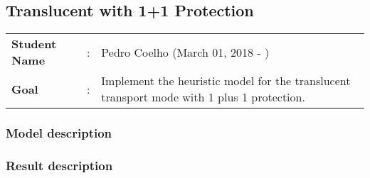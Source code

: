 \clearpage

\subsection{Translucent with 1+1 Protection}\label{heuristic_Transluc_Protection}
\begin{tcolorbox}	
\begin{tabular}{p{2.75cm} p{0.2cm} p{10.5cm}} 	
\textbf{Student Name}  &:& Pedro Coelho    (March 01, 2018 - )\\
\textbf{Goal}          &:& Implement the heuristic model for the translucent transport mode with 1 plus 1 protection.
\end{tabular}
\end{tcolorbox}

\subsubsection{Model description}

\subsubsection{Result description} 